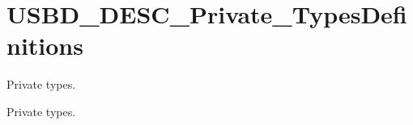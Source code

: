 \hypertarget{group__USBD__DESC__Private__TypesDefinitions}{}\section{U\+S\+B\+D\+\_\+\+D\+E\+S\+C\+\_\+\+Private\+\_\+\+Types\+Definitions}
\label{group__USBD__DESC__Private__TypesDefinitions}


Private types.  


Private types. 

